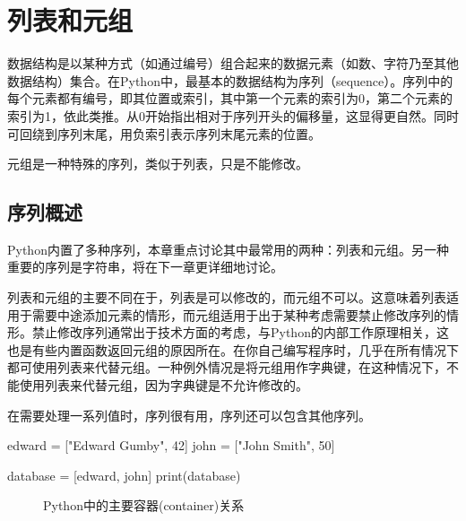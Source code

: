 \chapter{列表和元组}
数据结构是以某种方式（如通过编号）组合起来的数据元素（如数、字符乃至其他数据结构）集合。在Python中，最基本的数据结构为序列（sequence）。序列中的每个元素都有编号，即其位置或索引，其中第一个元素的索引为0，第二个元素的索引为1，依此类推。从0开始指出相对于序列开头的偏移量，这显得更自然。同时可回绕到序列末尾，用负索引表示序列末尾元素的位置。

元组是一种特殊的序列，类似于列表，只是不能修改。
\section{序列概述}
Python内置了多种序列，本章重点讨论其中最常用的两种：列表和元组。另一种重要的序列是字符串，将在下一章更详细地讨论。

列表和元组的主要不同在于，列表是可以修改的，而元组不可以。这意味着列表适用于需要中途添加元素的情形，而元组适用于出于某种考虑需要禁止修改序列的情形。禁止修改序列通常出于技术方面的考虑，与Python的内部工作原理相关，这也是有些内置函数返回元组的原因所在。在你自己编写程序时，几乎在所有情况下都可使用列表来代替元组。一种例外情况是将元组用作字典键，在这种情况下，不能使用列表来代替元组，因为字典键是不允许修改的。

在需要处理一系列值时，序列很有用，序列还可以包含其他序列。

\begin{pyc}
edward = ["Edward Gumby", 42]
john = ["John Smith", 50]

database = [edward, john]
print(database)
\end{pyc}

\begin{figure}
    \centering
    \caption{Python中的主要容器(container)关系}
    \label{containerInPython}
\end{figure}

